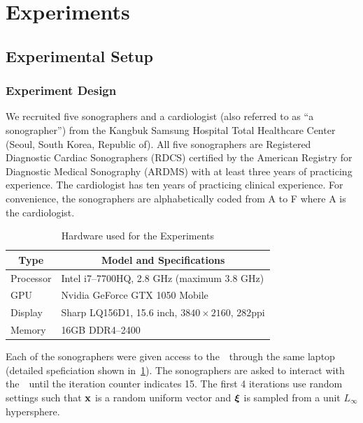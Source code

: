 

%

\section{Experiments}\label{section:eval}
\subsection{Experimental Setup}
\subsubsection{Experiment Design}
We recruited five sonographers and a cardiologist (also referred to as ``a sonographer'') from the Kangbuk Samsung Hospital Total Healthcare Center (Seoul, South Korea, Republic of).
All five sonographers are Registered Diagnostic Cardiac Sonographers (RDCS) certified by the American Registry for Diagnostic Medical Sonography (ARDMS) with at least three years of practicing experience.
The cardiologist has ten years of practicing clinical experience.
For convenience, the sonographers are alphabetically coded from A to F where A is the cardiologist.

\begin{table}
  \centering
  \caption{Hardware used for the Experiments}\label{table:specs}
  \begin{threeparttable}
  \begin{tabular}{ll}
    \toprule
    \multicolumn{1}{c}{\textbf{Type}}
    & \multicolumn{1}{c}{\textbf{Model and Specifications}}
    \\ \midrule
    Processor & Intel i7--7700HQ, 2.8 GHz (maximum 3.8 GHz) \\
    GPU       & Nvidia GeForce GTX 1050 Mobile \\
    Display   & Sharp LQ156D1, 15.6 inch, \(3840 \times 2160\), 282ppi  \\
    Memory    & 16GB DDR4--2400 \\ \bottomrule
  \end{tabular}
  \end{threeparttable}
\end{table}
%
Each of the sonographers were given access to the~\usdg~through the same laptop (detailed speficiation shown in~\cref{table:specs}).
The sonographers are asked to interact with the~\usdg~until the iteration counter indicates 15.
The first 4 iterations use random settings such that \(\mathbf{x}\) is a random uniform vector and \(\bm{\xi}\) is sampled from a unit \(L_{\infty}\) hypersphere.

